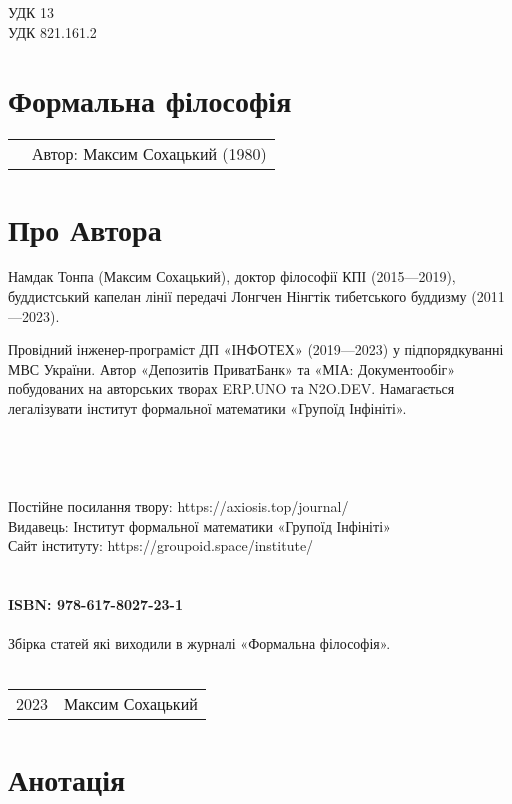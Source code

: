 \noindent УДК 13\\
УДК 821.161.2

\section*{Формальна філософія}

\begin{tabular}{ll}
& Автор: Максим Сохацький (1980)\\
\end{tabular}

\section*{Про Автора}
Намдак Тонпа (Максим Сохацький), доктор філософії КПІ (2015---2019),
буддистський капелан лінії передачі Лонгчен Нінгтік тибетського
буддизму (2011---2023).

Провідний інженер-програміст ДП «ІНФОТЕХ» (2019---2023)
у підпорядкуванні МВС України. Автор «Депозитів ПриватБанк» та «МІА: Документообіг» побудованих
на авторських творах ERP.UNO та N2O.DEV. Намагається легалізувати
інститут формальної математики «Групоїд Інфініті».
\\
\\
\\
\\
\\
Постійне посилання твору: https://axiosis.top/journal/ \\
Видавець: Інститут формальної математики «Групоїд Інфініті» \\
Сайт інституту: https://groupoid.space/institute/ \\
\\
\\
{\bf ISBN: 978-617-8027-23-1 \hspace{2em}}
\\
\\
\small
\indent Збірка статей які виходили в журналі «Формальна філософія».
\\
\\
\begin{tabular}{ll}
\textcopyright{} 2023 & Максим Сохацький
\end{tabular}

\newpage
\section*{Анотація}

\normalsize
